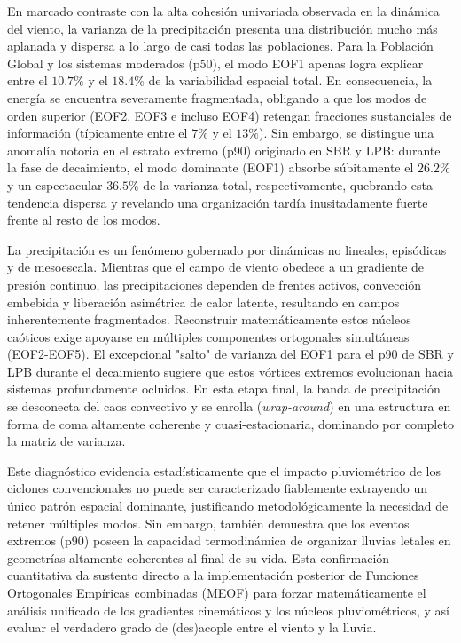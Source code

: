 En marcado contraste con la alta cohesión univariada observada en la dinámica del viento, la varianza de la precipitación presenta una distribución mucho más aplanada y dispersa a lo largo de casi todas las poblaciones. Para la Población Global y los sistemas moderados (p50), el modo EOF1 apenas logra explicar entre el $10.7\%$ y el $18.4\%$ de la variabilidad espacial total. En consecuencia, la energía se encuentra severamente fragmentada, obligando a que los modos de orden superior (EOF2, EOF3 e incluso EOF4) retengan fracciones sustanciales de información (típicamente entre el $7\%$ y el $13\%$). Sin embargo, se distingue una anomalía notoria en el estrato extremo (p90) originado en SBR y LPB: durante la fase de decaimiento, el modo dominante (EOF1) absorbe súbitamente el $26.2\%$ y un espectacular $36.5\%$ de la varianza total, respectivamente, quebrando esta tendencia dispersa y revelando una organización tardía inusitadamente fuerte frente al resto de los modos.

La precipitación es un fenómeno gobernado por dinámicas no lineales, episódicas y de mesoescala. Mientras que el campo de viento obedece a un gradiente de presión continuo, las precipitaciones dependen de frentes activos, convección embebida y liberación asimétrica de calor latente, resultando en campos inherentemente fragmentados. Reconstruir matemáticamente estos núcleos caóticos exige apoyarse en múltiples componentes ortogonales simultáneas (EOF2-EOF5). El excepcional "salto" de varianza del EOF1 para el p90 de SBR y LPB durante el decaimiento sugiere que estos vórtices extremos evolucionan hacia sistemas profundamente ocluidos. En esta etapa final, la banda de precipitación se desconecta del caos convectivo y se enrolla (\textit{wrap-around}) en una estructura en forma de coma altamente coherente y cuasi-estacionaria, dominando por completo la matriz de varianza.

Este diagnóstico evidencia estadísticamente que el impacto pluviométrico de los ciclones convencionales no puede ser caracterizado fiablemente extrayendo un único patrón espacial dominante, justificando metodológicamente la necesidad de retener múltiples modos. Sin embargo, también demuestra que los eventos extremos (p90) poseen la capacidad termodinámica de organizar lluvias letales en geometrías altamente coherentes al final de su vida. Esta confirmación cuantitativa da sustento directo a la implementación posterior de Funciones Ortogonales Empíricas combinadas (MEOF) para forzar matemáticamente el análisis unificado de los gradientes cinemáticos y los núcleos pluviométricos, y así evaluar el verdadero grado de (des)acople entre el viento y la lluvia.


